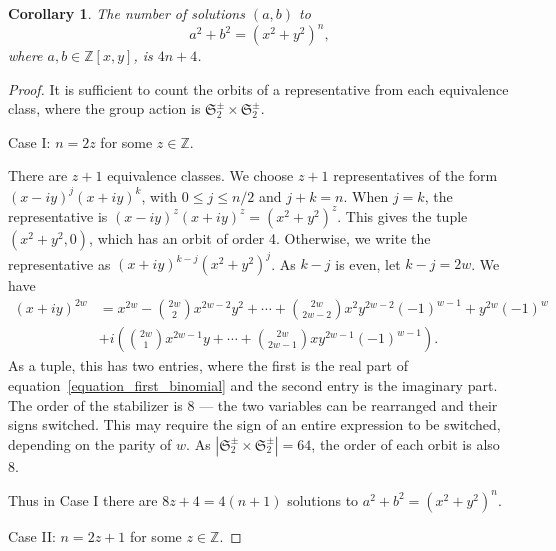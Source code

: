 \documentclass[12pt,table]{article}
\newtheorem{corollary}[theorem]{Corollary}
\theoremstyle{definition}
\theoremstyle{remark}
\newcommand{\Zzz}{\mathbb Z}
\numberwithin{equation}{section}
\newcommand{\myfrac}[2]{#1 / #2}
\begin{document}
\begin{corollary}

The number of solutions $ (a, b) $ to
\[
a^2 + b^2 = (x^2 + y^2)^n,
\]
where $ a, b \in \Zzz[x,y] $, is $4n + 4$.

\end{corollary}
\begin{proof}
It is sufficient to count the orbits of a representative from each
equivalence class, where the group action is
$ \mathfrak{S}_2^\pm \times \mathfrak{S}_2^\pm $.

\noindent
Case I: $ n = 2z $ for some $ z \in \Zzz $.

There are $ z + 1 $ equivalence classes. We choose $ z + 1 $
representatives of the form $ (x - iy)^j (x + iy)^k $, with
$ 0 \leq j \leq \myfrac{n}{2}$ and $ j + k = n $.
When $ j = k $, the representative
is $ (x - iy)^z (x + iy)^z = ( x^2 + y^2 ) ^ z $.
This gives the tuple $ ( x^2 + y^2, 0 ) $, which has an orbit of order 4.
Otherwise, we write the representative as $ (x + iy)^{k-j} (x^2 + y^2)^j $.
As $ k - j $ is even, let $ k - j = 2w $. We have
\begin{align}
\label{equation_first_binomial}
(x + iy) ^ {2w} &= x ^ {2w} - \binom{2w}{2}  x^{2w - 2 } y^2
+ \dotsb + \binom{2w}{2w-2} x^2 y^{2w - 2} (-1) ^ {w - 1}
+  y^{2w} (-1) ^ {w} \nonumber
\\
&+ i \left( \binom{2w}{1} x ^ {2w - 1} y + \dotsb +
\binom{2w}{2w-1}  x y ^ {2w -1} (-1)^{w-1} \right).
\end{align}
As a tuple, this has two entries, where the first is the real part
of equation~\eqref{equation_first_binomial} and the second entry
is the imaginary part.
The order of the stabilizer is 8 --- the two variables can be rearranged and their
signs switched. This may require the sign of an entire expression to be switched,
depending on the parity of $ w $.
As $ | \mathfrak{S}_2^\pm \times \mathfrak{S}_2^\pm | = 64$, the order of each orbit
is also 8. 

Thus in Case I there are $ 8z + 4 = 4 (n + 1 ) $ solutions
to $ a^2 + b^2 = (x^2 + y^2)^n $.



\noindent
Case II: $ n = 2z + 1$ for some $ z \in \Zzz $.


\end{proof}
\end{document}
